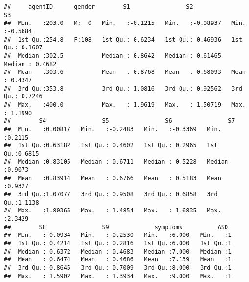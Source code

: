 \documentclass[]{article}
\newenvironment{Shaded}{\begin{snugshade}}{\end{snugshade}}
\newcommand{\KeywordTok}[1]{\textcolor[rgb]{0.13,0.29,0.53}{\textbf{#1}}}
\newcommand{\DecValTok}[1]{\textcolor[rgb]{0.00,0.00,0.81}{#1}}
\newcommand{\StringTok}[1]{\textcolor[rgb]{0.31,0.60,0.02}{#1}}
\newcommand{\CommentTok}[1]{\textcolor[rgb]{0.56,0.35,0.01}{\textit{#1}}}
\newcommand{\OperatorTok}[1]{\textcolor[rgb]{0.81,0.36,0.00}{\textbf{#1}}}
\newcommand{\NormalTok}[1]{#1}
\begin{document}
\begin{verbatim}
##     agentID      gender        S1                S2                 S3         
##  Min.   :203.0   M:  0   Min.   :-0.1215   Min.   :-0.08937   Min.   :-0.5684  
##  1st Qu.:254.8   F:108   1st Qu.: 0.6234   1st Qu.: 0.46936   1st Qu.: 0.1607  
##  Median :302.5           Median : 0.8642   Median : 0.61465   Median : 0.4682  
##  Mean   :303.6           Mean   : 0.8768   Mean   : 0.68093   Mean   : 0.4347  
##  3rd Qu.:353.8           3rd Qu.: 1.0816   3rd Qu.: 0.92562   3rd Qu.: 0.7246  
##  Max.   :400.0           Max.   : 1.9619   Max.   : 1.50719   Max.   : 1.1990  
##        S4                S5                S6                S7        
##  Min.   :0.00817   Min.   :-0.2483   Min.   :-0.3369   Min.   :0.2115  
##  1st Qu.:0.63182   1st Qu.: 0.4602   1st Qu.: 0.2965   1st Qu.:0.6815  
##  Median :0.83105   Median : 0.6711   Median : 0.5228   Median :0.9073  
##  Mean   :0.83914   Mean   : 0.6766   Mean   : 0.5183   Mean   :0.9327  
##  3rd Qu.:1.07077   3rd Qu.: 0.9508   3rd Qu.: 0.6858   3rd Qu.:1.1138  
##  Max.   :1.80365   Max.   : 1.4854   Max.   : 1.6835   Max.   :2.3429  
##        S8                S9             symptoms          ASD   
##  Min.   :-0.0934   Min.   :-0.2530   Min.   :6.000   Min.   :1  
##  1st Qu.: 0.4214   1st Qu.: 0.2816   1st Qu.:6.000   1st Qu.:1  
##  Median : 0.6372   Median : 0.4683   Median :7.000   Median :1  
##  Mean   : 0.6474   Mean   : 0.4686   Mean   :7.139   Mean   :1  
##  3rd Qu.: 0.8645   3rd Qu.: 0.7009   3rd Qu.:8.000   3rd Qu.:1  
##  Max.   : 1.5902   Max.   : 1.3934   Max.   :9.000   Max.   :1
\end{verbatim}

\begin{Shaded}
\end{Shaded}
\end{document}
